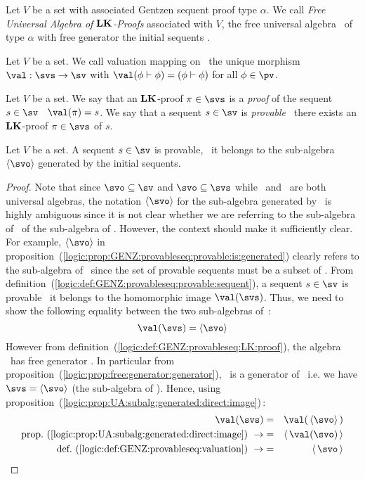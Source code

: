 \begin{defin}\label{logic:def:GENZ:provableseq:LK:proof}
Let $V$ be a set with associated Gentzen sequent proof type
$\alpha$. We call {\em Free Universal Algebra of $\bf LK$-Proofs}
associated with $V$, the free universal algebra \svs\ of type
$\alpha$  with free generator the initial sequents \svo.
\end{defin}

\begin{defin}\label{logic:def:GENZ:provableseq:valuation}
Let $V$ be a set. We call valuation mapping on \svs\ the unique
morphism $\val:\svs\to\sv$ with
$\val(\phi\vdash\phi)=(\phi\vdash\phi)$ for all $\phi\in\pv$.
\end{defin}

\begin{defin}\label{logic:def:GENZ:provableseq:provable:sequent}
Let $V$ be a set. We say that an $\bf LK$-proof $\pi\in\svs$ is a
{\em proof} of the sequent $s\in\sv$ \ifand\ $\val(\pi)=s$. We say
that a sequent $s\in\sv$ is {\em provable} \ifand\ there exists an
$\bf LK$-proof $\pi\in\svs$ of $s$.
\end{defin}

\begin{prop}\label{logic:prop:GENZ:provableseq:provable:is:generated}
Let $V$ be a set. A sequent $s\in\sv$ is provable, \ifand\ it
belongs to the sub-algebra $\langle \svo\rangle$ generated by the
initial sequents.
\end{prop}
\begin{proof}
Note that since $\svo\subseteq\sv$ and $\svo\subseteq\svs$ while
\sv\ and \svs\ are both universal algebras, the notation $\langle
\svo\rangle$ for the sub-algebra generated by \svo\ is highly
ambiguous since it is not clear whether we are referring to the
sub-algebra of \sv\ of the sub-algebra of \svs. However, the context
should make it sufficiently clear. For example, $\langle
\svo\rangle$ in
proposition~(\ref{logic:prop:GENZ:provableseq:provable:is:generated})
clearly refers to the sub-algebra of \sv\ since the set of provable
sequents must be a subset of \sv. From
definition~(\ref{logic:def:GENZ:provableseq:provable:sequent}), a
sequent $s\in\sv$ is provable \ifand\ it belongs to the homomorphic
image $\val(\svs)$. Thus, we need to show the following equality
between the two sub-algebras of \sv\,:
    \[
    \val(\svs)=\langle \svo\rangle
    \]
However from definition~(\ref{logic:def:GENZ:provableseq:LK:proof}),
the algebra \svs\ has free generator \svo. In particular from
proposition~(\ref{logic:prop:free:generator:generator}), \svo\ is a
generator of \svs\, i.e. we have $\svs=\langle \svo\rangle$ (the
sub-algebra of \svs). Hence, using
proposition~(\ref{logic:prop:UA:subalg:generated:direct:image})\,:
    \begin{eqnarray*}
    \val(\svs)&=&\val(\,\langle \svo\rangle\,)\\
    \mbox{prop.~(\ref{logic:prop:UA:subalg:generated:direct:image})}
    \ \rightarrow
    &=&\langle\,\val(\svo)\,\rangle\\
    \mbox{def.~(\ref{logic:def:GENZ:provableseq:valuation})}\ \rightarrow
    &=&\langle\,\svo\,\rangle\\
    \end{eqnarray*}
\end{proof}
